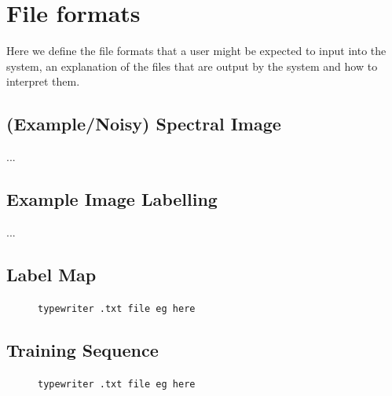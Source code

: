 \documentclass[12pt,twoside,notitlepage]{report}
\begin{document}

\cleardoublepage
{}

\cleardoublepage










\appendix


\cleardoublepage
\chapter{File formats}    \label{app:file_formats}
    Here we define the file formats that a user might be expected to input into the system, an explanation of the 
    files that are output by the system and how to interpret them.

    \section{(Example/Noisy) Spectral Image}
        ...


    \section{Example Image Labelling}
        ...
    
    \section{Label Map}
        \begin{figure}[H]
            \begin{framed}
                {\tt typewriter .txt file eg here }
            \end{framed}
        \end{figure}

    \section{Training Sequence}
        \begin{figure}[H]
            \begin{framed}
                {\tt typewriter .txt file eg here }
            \end{framed}
        \end{figure}
\end{document}
